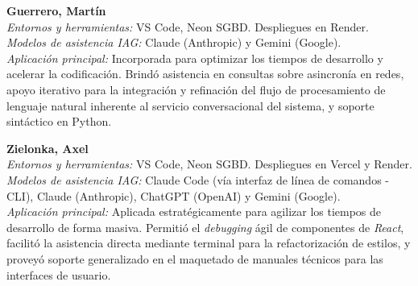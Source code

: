 \vspace{0.3cm}

\noindent \textbf{Guerrero, Martín} \\
\textit{Entornos y herramientas:} VS Code, Neon SGBD. Despliegues en Render. \\
\textit{Modelos de asistencia IAG:} Claude (Anthropic) y Gemini (Google). \\
\textit{Aplicación principal:} Incorporada para optimizar los tiempos de desarrollo y acelerar la codificación. Brindó asistencia en consultas sobre asincronía en redes, apoyo iterativo para la integración y refinación del flujo de procesamiento de lenguaje natural inherente al servicio conversacional del sistema, y soporte sintáctico en Python.

\vspace{0.3cm}

\noindent \textbf{Zielonka, Axel} \\
\textit{Entornos y herramientas:} VS Code, Neon SGBD. Despliegues en Vercel y Render. \\
\textit{Modelos de asistencia IAG:} Claude Code (vía interfaz de línea de comandos - CLI), Claude (Anthropic), ChatGPT (OpenAI) y Gemini (Google). \\
\textit{Aplicación principal:} Aplicada estratégicamente para agilizar los tiempos de desarrollo de forma masiva. Permitió el \textit{debugging} ágil de componentes de \textit{React}, facilitó la asistencia directa mediante terminal para la refactorización de estilos, y proveyó soporte generalizado en el maquetado de manuales técnicos para las interfaces de usuario.
